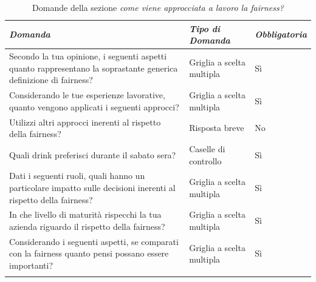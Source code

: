 \begin{longtable}{| p{} | p{} | p{} |} 
\hline\textbf{\textit{Domanda}} & \textbf{\textit{Tipo di Domanda}} & \textbf{\textit{Obbligatoria}}\\
\hline
\endhead 

\hline 
Secondo la tua opinione, i seguenti aspetti quanto rappresentano la soprastante generica definizione di fairness?

& Griglia a scelta multipla

& Sì 

\\ \hline
\rowcolor{Gray!30}
Considerando le tue esperienze lavorative, quanto vengono applicati i seguenti approcci?

& Griglia a scelta multipla

& Sì 

\\ \hline

Utilizzi altri approcci inerenti al rispetto della fairness?   

&  Risposta breve

& No

\\ \hline
\rowcolor{Gray!30}
Quali drink preferisci durante il sabato sera?

&  Caselle di controllo

& Sì

\\ \hline 
Dati i seguenti ruoli, quali hanno un particolare impatto sulle decisioni inerenti al rispetto della fairness?

& Griglia a scelta multipla

& Sì 

\\ \hline
\rowcolor{Gray!30}
In che livello di maturità rispecchi la tua azienda riguardo il rispetto della fairness?

& Griglia a scelta multipla

& Sì 

\\ \hline
Considerando i seguenti aspetti, se comparati con la fairness quanto pensi possano essere importanti?

& Griglia a scelta multipla

& Sì 

\\ \hline
\caption{Domande della sezione \emph{come viene approcciata a lavoro la fairness?}} %
\label{tab:myfirstlongtable}
\end{longtable}

